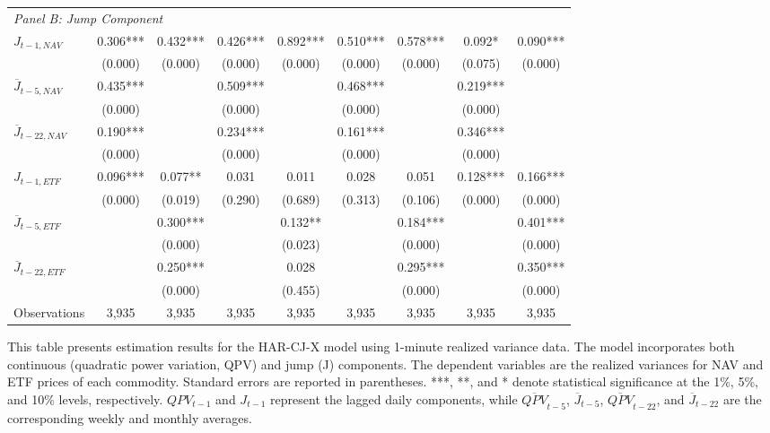 \begin{landscape}
\begin{table}[htbp]
\begin{threeparttable}
\begin{tabular}{@{}lcccccccc@{}}
\multicolumn{9}{l}{\textit{Panel B: Jump Component}} \\
\addlinespace[0.1cm]
$J_{t-1,NAV}$ & 0.306*** & 0.432*** & 0.426*** & 0.892*** & 0.510*** & 0.578*** & 0.092* & 0.090*** \\
              & (0.000) & (0.000) & (0.000) & (0.000) & (0.000) & (0.000) & (0.075) & (0.000) \\
\addlinespace[0.05cm]
$\overline{J}_{t-5,NAV}$ & 0.435*** &  & 0.509*** &  & 0.468*** &  & 0.219*** &  \\
                        & (0.000) &  & (0.000) &  & (0.000) &  & (0.000) &  \\
\addlinespace[0.05cm]
$\overline{J}_{t-22,NAV}$ & 0.190*** &  & 0.234*** &  & 0.161*** &  & 0.346*** &  \\
                         & (0.000) &  & (0.000) &  & (0.000) &  & (0.000) &  \\
\addlinespace[0.05cm]
$J_{t-1,ETF}$ & 0.096*** & 0.077** & 0.031 & 0.011 & 0.028 & 0.051 & 0.128*** & 0.166*** \\
              & (0.000) & (0.019) & (0.290) & (0.689) & (0.313) & (0.106) & (0.000) & (0.000) \\
\addlinespace[0.05cm]
$\overline{J}_{t-5,ETF}$ &  & 0.300*** &  & 0.132** &  & 0.184*** &  & 0.401*** \\
                        &  & (0.000) &  & (0.023) &  & (0.000) &  & (0.000) \\
\addlinespace[0.05cm]
$\overline{J}_{t-22,ETF}$ &  & 0.250*** &  & 0.028 &  & 0.295*** &  & 0.350*** \\
                         &  & (0.000) &  & (0.455) &  & (0.000) &  & (0.000) \\
\midrule
Observations & 3,935 & 3,935 & 3,935 & 3,935 & 3,935 & 3,935 & 3,935 & 3,935 \\
\bottomrule
\end{tabular}
\begin{tablenotes}
\small
\item This table presents estimation results for the HAR-CJ-X model using 1-minute realized variance data. The model incorporates both continuous (quadratic power variation, QPV) and jump (J) components. The dependent variables are the realized variances for NAV and ETF prices of each commodity. Standard errors are reported in parentheses. ***, **, and * denote statistical significance at the 1\%, 5\%, and 10\% levels, respectively. $QPV_{t-1}$ and $J_{t-1}$ represent the lagged daily components, while $\overline{QPV}_{t-5}$, $\overline{J}_{t-5}$, $\overline{QPV}_{t-22}$, and $\overline{J}_{t-22}$ are the corresponding weekly and monthly averages.
\end{tablenotes}
\end{threeparttable}
\end{table}
\end{landscape}


